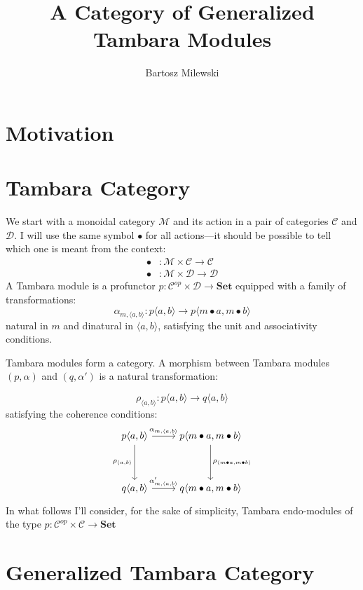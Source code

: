 \documentclass[11pt]{amsart}
\author{Bartosz Milewski}
\title{A Category of Generalized Tambara Modules}
\newcommand{\cat}[1]{\mathcal{#1}}%
\newcommand{\Cat}[1]{\mathbf{#1}}%
\begin{document}
\maketitle{}

\section{Motivation}

\section{Tambara Category}

We start with a monoidal category $\cat M$ and its action in a pair of categories $\cat C$ and $ \cat D$. I will use the same symbol $\bullet$ for all actions---it should be possible to tell which one is meant from the context:
\begin{align*} 
\bullet &\colon \cat M \times \cat C \to \cat C 
\\
 \bullet &\colon \cat M \times \cat D \to \cat D 
\end{align*}
A Tambara module is a profunctor $p \colon \cat C^{op} \times \cat D \to \Cat{Set}$ equipped with a family of transformations:
\[ \alpha_{m, \langle a, b \rangle} \colon p \langle a, b \rangle \to p \langle m \bullet a, m \bullet b \rangle \]
natural in $m$ and dinatural in $\langle a, b \rangle$, satisfying the unit and associativity conditions. 

Tambara modules form a category.  A morphism between Tambara modules $(p, \alpha)$ and $(q, \alpha')$ is a natural transformation:

\[ \rho_{\langle a, b \rangle} \colon p \langle a, b \rangle \to q \langle a, b \rangle \]
 satisfying the coherence conditions:
\[
 \begin{tikzcd}
 p \langle a, b \rangle
 \arrow[r, "{\alpha_{m, \langle a, b \rangle}}"]
 \arrow[dd, "{\rho_{ \langle a, b \rangle}}"']
& p \langle m \bullet a, m \bullet b \rangle
 \arrow[dd, "{\rho_{\langle m \bullet a, m \bullet b \rangle}}"]
 \\
  \\
 q \langle a, b \rangle
 \arrow[r, "{\alpha'_{m, \langle a, b \rangle}}"]
& q \langle m \bullet a, m \bullet b \rangle
 \end{tikzcd}
\]
In what follows I'll consider, for the sake of simplicity, Tambara endo-modules of the type  $p \colon \cat C^{op} \times \cat C \to \Cat{Set}$

\section{Generalized Tambara Category}
\end{document}
